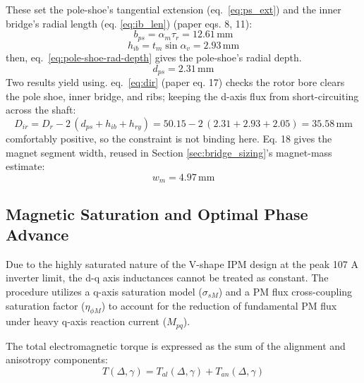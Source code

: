 \documentclass[11pt,a4paper]{article}
\begin{document}
These set the pole-shoe's tangential extension (eq.~\ref{eq:ps_ext}) and the inner bridge's radial length (eq. \ref{eq:ib_len}) (paper eqs. 8, 11):
\begin{equation}
    \label{eq:ps_ext}
    b_{ps} = \alpha_m\tau_r = 12.61\,\text{mm}
\end{equation}
\begin{equation}
    \label{eq:ib_len}
    h_{ib} = t_m\sin\alpha_v = 2.93\,\text{mm}
\end{equation}
then, eq.~\ref{eq:pole-shoe-rad-depth} gives the pole-shoe's radial depth.
\begin{equation}
    \label{eq:pole-shoe-rad-depth}
    d_{ps} = 2.31\,\text{mm}
\end{equation}
Two results yield using. eq.~\ref{eq:dir} (paper eq. 17) checks the rotor bore clears the pole shoe, inner bridge, and ribs; keeping the d-axis flux from short-circuiting across the shaft:
\begin{equation}
    \label{eq:dir}
    D_{ir} = D_r - 2\,(d_{ps}+h_{ib}+h_{ry}) = 50.15-2\,(2.31+2.93+2.05) = 35.58\,\text{mm}
\end{equation}
comfortably positive, so the constraint is not binding here. Eq. 18 gives the magnet segment width, reused in Section \ref{sec:bridge_sizing}'s magnet-mass estimate:
\begin{equation}
    w_m = 4.97\,\text{mm}
\end{equation}

\subsection*{Magnetic Saturation and Optimal Phase Advance}
\label{sec:saturation_phase_advance}
Due to the highly saturated nature of the V-shape IPM design at the peak 107 A inverter limit, the d-q axis inductances cannot be treated as constant. The procedure utilizes a q-axis saturation model ($\sigma_{sM}$) and a PM flux cross-coupling saturation factor ($\eta_{\phi M}$) to account for the reduction of fundamental PM flux under heavy q-axis reaction current ($M_{pq}$).

The total electromagnetic torque is expressed as the sum of the alignment and anisotropy components:
\begin{equation}
    T(\Delta, \gamma) = T_{al}(\Delta, \gamma) + T_{an}(\Delta, \gamma)
\end{equation}
\end{document}
